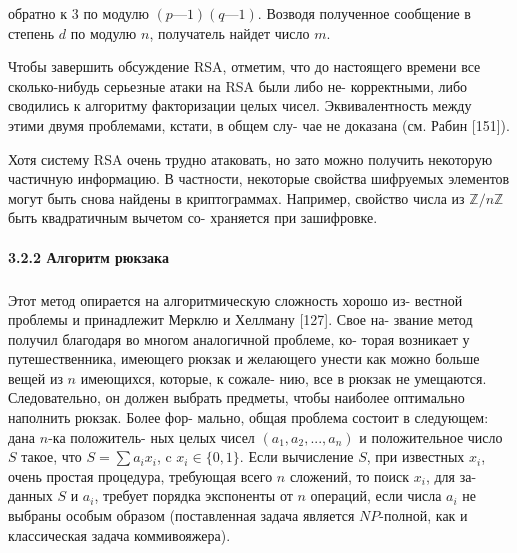 \documentclass{../template/mai_book}
\begin{document}
\noindent обратно к $3$ по модулю $(p — 1)(q — 1)$. Возводя полученное сообщение в\linebreak
степень $d$ по модулю $n$, получатель найдет число $m$.

Чтобы завершить обсуждение RSA, отметим, что до настоящего\linebreak
времени все сколько-нибудь серьезные атаки на RSA были либо не­-\linebreak
корректными, либо сводились к алгоритму факторизации целых чисел.\linebreak
Эквивалентность между этими двумя проблемами, кстати, в общем слу­-\linebreak
чае не доказана (см. Рабин [151]).

Хотя систему RSA очень трудно атаковать, но зато можно получить\linebreak
некоторую частичную информацию. В частности, некоторые свойства\linebreak
шифруемых элементов могут быть снова найдены в криптограммах.\linebreak
Например, свойство числа из $\mathbb{Z}/n\mathbb{Z}$ быть квадратичным вычетом со-\linebreak
храняется при зашифровке.

\paragraph{3.2.2 Алгоритм рюкзака}
\subparagraph{}Этот метод опирается на алгоритмическую сложность хорошо из-\linebreak 
вестной проблемы и принадлежит Мерклю и Хеллману [127]. Свое на­-\linebreak
звание метод получил благодаря во многом аналогичной проблеме, ко-\linebreak
торая возникает у путешественника, имеющего рюкзак и желающего\linebreak
унести как можно больше вещей из $n$ имеющихся, которые, к сожале-\linebreak
­нию, все в рюкзак не умещаются. Следовательно, он должен выбрать\linebreak
предметы, чтобы наиболее оптимально наполнить рюкзак. Более фор-\linebreak
­мально, общая проблема состоит в следующем: дана $n$-ка положитель-\linebreak
ных целых чисел $(a_1, a_2,...,a_n)$ и положительное число $S$ такое, что\linebreak
$S=\sum a_i x_i$, c $x_i \in \{0, 1\}$. Если вычисление $S$, при известных $x_i$, очень\linebreak
простая процедура, требующая всего $n$ сложений, то поиск $x_i$, для за-\linebreak
данных $S$ и $a_i$, требует порядка экспоненты от $n$ операций, если числа $a_i$\linebreak
не выбраны особым образом (поставленная задача является $N P$-полной,\linebreak
как и классическая задача коммивояжера).
\end{document}

